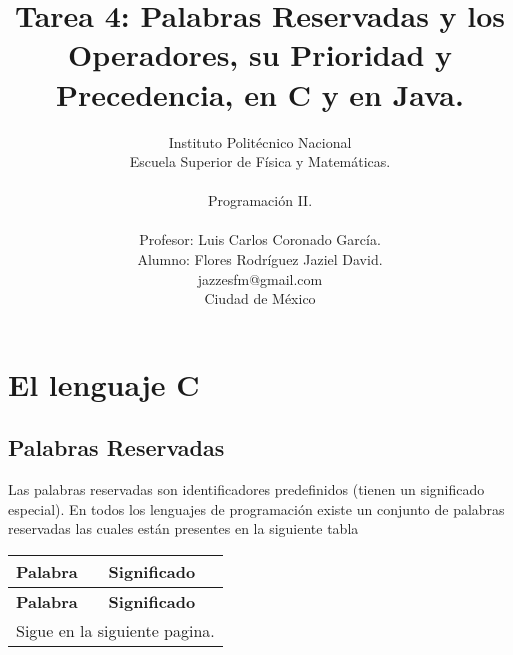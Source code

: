 \documentclass[12pt, A4]{article}
\title{Tarea 4: Palabras Reservadas y los Operadores, su Prioridad y Precedencia, en C y en Java.}
\author{Instituto Politécnico Nacional\\
        Escuela Superior de Física y Matemáticas. \\
        \\
        Programación II. \\ \\
        Profesor: Luis Carlos Coronado García.\\
        Alumno: Flores Rodríguez Jaziel David. \\
  \small jazzesfm@gmail.com\\
  \small Ciudad de México
  \date{}
}
\begin{document}
 
\maketitle
	\section{El lenguaje C}
	{
		\subsection{Palabras Reservadas}
		{
	Las palabras reservadas son identificadores predefinidos (tienen un significado especial). En todos los lenguajes de programación existe un conjunto de palabras reservadas las cuales están presentes en la siguiente tabla
	\begin{longtable}[h]{p{3cm} p{10cm}}
		
		\hline
		
		\textbf{Palabra} & \textbf{Significado} \\
		\hline\hline
		\endfirsthead
		
		\hline
		\textbf{Palabra} & \textbf{Significado} \\
		\hline\hline
		\endhead
		
		\multicolumn{2}{r}{Sigue en la siguiente pagina.}
		\endfoot
		
		\endlastfoot
		

\end{longtable}}}
\end{document}
